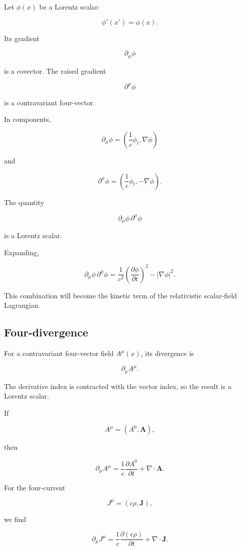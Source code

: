 Let \(\phi(x)\) be a Lorentz scalar:

\[
\phi'(x')=\phi(x).
\]

Its gradient

\[
\partial_{\mu}\phi
\]

is a covector. The raised gradient

\[
\partial^{\mu}\phi
\]

is a contravariant four-vector.

In components,

\[
\boxed{
\partial_{\mu}\phi
=
\left(
\frac{1}{c}\phi_{t},
\nabla\phi
\right)
}
\]

and

\[
\boxed{
\partial^{\mu}\phi
=
\left(
\frac{1}{c}\phi_{t},
-\nabla\phi
\right)
}.
\]

The quantity

\[
\partial_{\mu}\phi\,
\partial^{\mu}\phi
\]

is a Lorentz scalar.

Expanding,

\[
\boxed{
\partial_{\mu}\phi\,
\partial^{\mu}\phi
=
\frac{1}{c^{2}}
\left(
\frac{\partial\phi}{\partial t}
\right)^{2}
-
|\nabla\phi|^{2}
}.
\]

This combination will become the kinetic term of the relativistic scalar-field Lagrangian.

\subsection{Four-divergence}

For a contravariant four-vector field \(A^{\mu}(x)\), its divergence is

\[
\boxed{
\partial_{\mu}A^{\mu}
}.
\]

The derivative index is contracted with the vector index, so the result is a Lorentz scalar.

If

\[
A^{\mu}=(A^{0},\mathbf{A}),
\]

then

\[
\boxed{
\partial_{\mu}A^{\mu}
=
\frac{1}{c}
\frac{\partial A^{0}}{\partial t}
+
\nabla\cdot\mathbf{A}
}.
\]

For the four-current

\[
J^{\mu}=(c\rho,\mathbf{J}),
\]

we find

\[
\partial_{\mu}J^{\mu}
=
\frac{1}{c}
\frac{\partial(c\rho)}{\partial t}
+
\nabla\cdot\mathbf{J}.
\]

